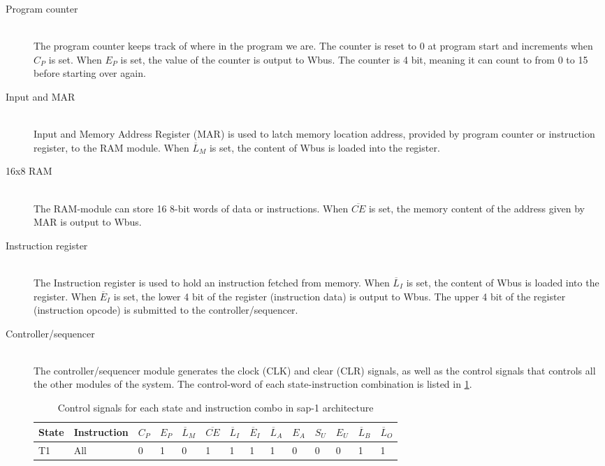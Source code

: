 \begin{description}
    \item[Program counter] \hfill \\
    The program counter keeps track of where in the program we are. The counter is reset to 0 at program start and increments when $C_P$ is set. When $E_P$ is set, the value of the counter is output to Wbus. The counter is 4 bit, meaning it can count to from 0 to 15 before starting over again.
    \item[Input and MAR] \hfill \\
    Input and Memory Address Register (MAR) is used to latch  memory location address, provided by program counter or instruction register, to the RAM module. When $\overline{L}_M$ is set, the content of Wbus is loaded into the register.  
    \item[16x8 RAM] \hfill \\
    The RAM-module can store 16 8-bit words of data or instructions. When $\overline{CE}$ is set, the memory content of the address given by MAR is output to Wbus.
    \item[Instruction register] \hfill \\
    The Instruction register is used to hold an instruction fetched from memory. When $\overline{L}_I$ is set, the content of Wbus is loaded into the register. When $\overline{E}_I$ is set, the lower 4 bit of the register (instruction data) is output to Wbus. The upper 4 bit of the register (instruction opcode) is submitted to the controller/sequencer.
    \item[Controller/sequencer] \hfill \\
    The controller/sequencer module generates the clock (CLK) and clear (CLR) signals, as well as the control signals that controls all the other modules of the system. The control-word of each state-instruction combination is listed in \cref{tab:sap1control}.
    \begin{table}[hbpt]
    \centering
    \caption{\label{tab:sap1control}Control signals for each state and instruction combo in \gls{sap-1} architecture}
    \begin{tabular}{p{0.8cm}lp{0.3cm}p{0.3cm}p{0.3cm}p{0.3cm}p{0.3cm}p{0.3cm}p{0.3cm}p{0.3cm}p{0.3cm}p{0.3cm}p{0.3cm}p{0.3cm}}
    \textbf{State} & \textbf{Instruction} & $C_P$ & $E_P$ & $\overline{L}_M$ & $\overline{CE}$ & $\overline{L}_I$ & $\overline{E}_I$ & $\overline{L}_A$ & $E_A$ & $S_U$ & $E_U$ & $\overline{L}_B$ & $\overline{L}_O$\\
    \hline
    T1 &All&	        0&	1&	0&	1&	1&	1&	1&	0&	0&	0&	1&	1\\

\end{tabular}
\end{table}
\end{description}
